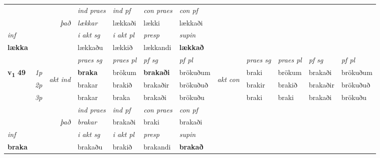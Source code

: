\begin{longtable}[l]{X>{\footnotesize\itshape}llXXXXlXXXX}
   && &  \textit{ind praes} & \textit{ind pf} & \textit{con praes} & \textit{con pf} \\*
\multicolumn{3}{r}{\textit{það}} & lækkar & lækkaði & lækki & lækkaði \\*

\cmidrule{4-7}
   {\textit{inf}} & &  & \textit{i akt sg} & \textit{i akt pl}   & \textit{presp} & \textit{supin}   \\*
  {\textbf{lækka}} & && lækkaðu  & lækkið   & lækkandi &  \textbf{lækkað}   \\*

\midrule

 & &   & \textit{praes sg}  & \textit{praes pl}    & \textit{ pf sg} & \textit{pf pl} & & \textit{praes sg}  & \textit{praes pl}    & \textit{pf sg} & \textit{pf pl }  \\ \cmidrule{4-7} \cmidrule{9-12}
 \multirow{2}{*}{{{\textbf{v{\textsubscript{1}}} \Large{\textbf{49}}}}}  & 1p & \multirow{3}{*}{\begin{turn}{90}\textit{akt ind}\end{turn}} & \textbf{braka} & brökum & \textbf{brakaði} & brökuðum & \multirow{3}{*}{\begin{turn}{90}\textit{akt con}\end{turn}} &braki & brökum & brakaði & brökuðum\\*
 & 2p &  &  brakar  & brakið & brakaðir & brökuðuð & & brakir & brakið & brakaðir & brökuðuð \\*
 & 3p &  & brakar & braka & brakaði & brökuðu & & braki & braki& brakaði & brökuðu \\*
\cmidrule{4-7} \cmidrule{9-12}

   && &  \textit{ind praes} & \textit{ind pf} & \textit{con praes} & \textit{con pf} \\*
\multicolumn{3}{r}{\textit{það}} & brakar & brakaði & braki & brakaði \\*

\cmidrule{4-7}
   {\textit{inf}} & &  & \textit{i akt sg} & \textit{i akt pl}   & \textit{presp} & \textit{supin}   \\*
  {\textbf{braka}} & && brakaðu  & brakið   & brakandi &  \textbf{brakað}   \\*

\midrule


\end{longtable}
